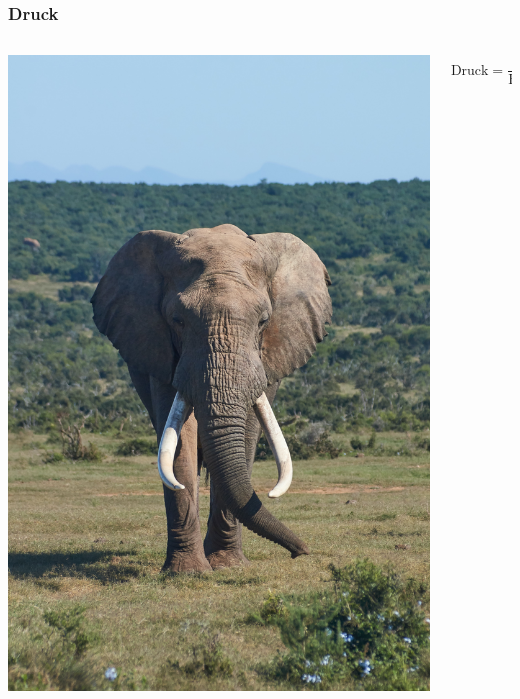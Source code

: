 \documentclass{beamer}
\begin{document}
\begin{frame}
\frametitle{Druck}

\begin{columns}[c]

\begin{column}{5cm}
\includegraphics[width=\textwidth]{elephant.jpg}
\end{column}

\begin{column}{5cm}

\[
\text{Druck} = \frac{\text{Kraft}}{\text{Fläche}}
\]

$\,$\\[0.5cm]


\end{column}
\end{columns}
\end{frame}
\end{document}
